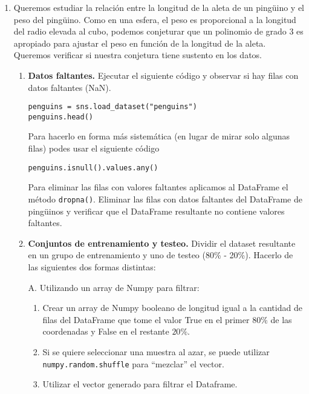\documentclass[a4paper,11pt]{article}
\theoremstyle{definition}
\begin{document}
\begin{enumerate}

\item \label{ejer:grado3} Queremos estudiar la relación entre la longitud de la aleta de un ping\"uino y el peso del ping\"uino. Como en una esfera, el peso es proporcional a la longitud del radio elevada al cubo, podemos conjeturar que un polinomio de grado 3 es apropiado para ajustar el peso en función de la longitud de la aleta. Queremos verificar si nuestra conjetura tiene sustento en los datos.
\begin{enumerate}
\item \label{item:nan} \textbf{Datos faltantes.} Ejecutar el siguiente c\'odigo y observar si hay filas con datos faltantes (NaN).
\begin{lstlisting}
penguins = sns.load_dataset("penguins")
penguins.head()
\end{lstlisting}

Para hacerlo en forma más sistemática (en lugar de mirar solo algunas filas) podes usar el siguiente código
\begin{lstlisting}
penguins.isnull().values.any()
\end{lstlisting}

Para eliminar las filas con valores faltantes aplicamos al DataFrame el método \lstinline{dropna()}. Eliminar las filas con datos faltantes del DataFrame de ping\"uinos y verificar que el DataFrame resultante no contiene valores faltantes.

\item \textbf{Conjuntos de entrenamiento y testeo.} Dividir el dataset resultante  en un grupo de entrenamiento y uno de testeo (80\% - 20\%).
Hacerlo de las siguientes dos formas distintas:

\vspace{.5cm}

A. Utilizando un array de Numpy para filtrar:
\begin{enumerate}
\item Crear un array de Numpy booleano de longitud igual a la cantidad de filas del DataFrame que tome el valor True en el primer $80\%$ de las coordenadas y False en el restante $20\%$.
\item Si se quiere seleccionar una muestra al azar, se puede utilizar \lstinline{numpy.random.shuffle} para ``mezclar'' el vector.
\item Utilizar el vector generado para filtrar el Dataframe.
\end{enumerate}


\end{enumerate}
\end{enumerate}
\end{document}
